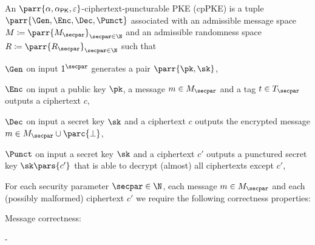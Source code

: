 \begin{definition}
    An \(\parr{\alpha,\alpha_{\textsf{PK}},\varepsilon}\)-ciphertext-puncturable PKE (cpPKE) is a tuple \(\parr{\Gen,\Enc,\Dec,\Punct}\) associated with an admissible message space \(M \coloneqq \parr{M_\secpar}_{\secpar \in \N}\) and
    an admissible randomness space \(R \coloneqq \parr{R_\secpar}_{\secpar \in \N}\) such that
    \begin{sitemize}
        \item \(\Gen\) on input \(1^\secpar\) generates a pair \(\parr{\pk,\sk}\),
        \item \(\Enc\) on input a public key \(\pk\), a message \(m \in M_\secpar\) and a tag \(t \in T_\secpar\) outputs a ciphertext \(c\),
        \item \(\Dec\) on input a secret key \(\sk\) and a ciphertext \(c\) outputs the encrypted message \(m \in M_\secpar \cup \parc{\bot}\),
        \item \(\Punct\) on input a secret key \(\sk\) and a ciphertext \(c'\) outputs a punctured secret key \(\sk\pars{c'}\) that is able to decrypt (almost) all ciphertexts except \(c'\),
    \end{sitemize}
    For each security parameter \(\secpar \in \N\),
    each message \(m \in M_\secpar\) and
    each (possibly malformed) ciphertext \(c'\) we require the following correctness properties:
    \begin{sitemize}
        \item Message correctness:
        \begin{bralign}
             - \alpha\parr{\secpar}
        \end{bralign}


\end{sitemize}
\end{definition}
